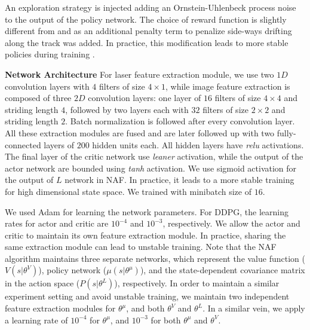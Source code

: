 \documentclass[../thesis.tex]{subfiles}
\begin{document}
An exploration strategy is injected adding an Ornstein-Uhlenbeck process noise \cite{uhlenbeck1930theory} to the output of the policy network. The choice of reward function is slightly different from  \citep{DBLP:journals/corr/LillicrapHPHETS15} and \citep{A3C} as an additional penalty term to penalize side-ways drifting along the track was added. In practice, this modification leads to more stable policies during training \cite{BenLau16}. 

\textbf{Network Architecture}
For laser feature extraction module, we use two $1D$ convolution layers with $4$ filters of size $4 \times 1$, while image feature extraction is composed of three $2D$ convolution layers: one layer of $16$ filters of size $4 \times 4$ and striding length $4$, followed by two layers each with $32$ filters of size $2 \times 2 $ and striding length $2$. Batch normalization is followed after every convolution layer. All these extraction modules are fused and are later followed up with two fully-connected layers of $200$ hidden units each. All hidden layers have \emph{relu} activations. The final layer of the critic network use \emph{leaner} activation, while the output of the actor network are bounded using \emph{tanh} activation. We use sigmoid activation for the output of $L$ network in NAF. In practice, it leads to a more stable training for high dimensional state space. We trained with minibatch size of $16$. 

We used Adam  for learning the network parameters. For DDPG, the learning rates for actor and critic are $10^{-4}$ and $10^{-3}$, respectively. We allow the actor and critic to maintain its own feature extraction module. In practice, sharing the same extraction module can lead to unstable training. Note that the NAF algorithm maintains three separate networks, which represent the value function ($V(s|\theta^V)$), policy network ($\mu(s|\theta^\mu)$), and the state-dependent covariance matrix in the action space ($P(s|\theta^L)$), respectively. In order to maintain a similar experiment setting and avoid unstable training, we maintain two independent feature extraction modules for $\theta^\mu$, and both $\theta^V$ and $\theta^L$. In a similar vein, we apply a learning rate of $10^{-4}$ for $\theta^\mu$, and $10^{-3}$ for both  $\theta^\mu$ and $\theta^V$. 
\end{document}

